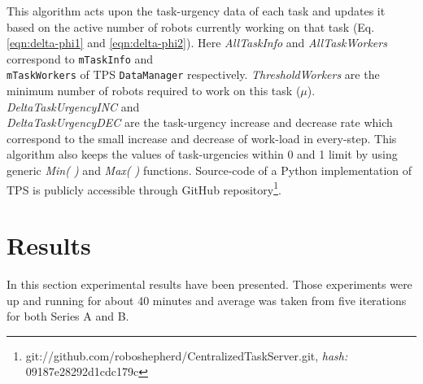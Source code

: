 This algorithm acts upon the task-urgency data of each task and updates it based on the active number of robots currently working on that task (Eq. \ref{eqn:delta-phi1} and \ref{eqn:delta-phi2}). Here \textit{AllTaskInfo} and \textit{AllTaskWorkers}  correspond to  \texttt{mTaskInfo} and\\ \texttt{mTaskWorkers} of TPS \texttt{DataManager} respectively.  \textit{ThresholdWorkers} are the minimum number of robots required to work on this task ($\mu$). \textit{DeltaTaskUrgencyINC} and\\ \textit{DeltaTaskUrgencyDEC} are the task-urgency increase and decrease rate which correspond to the small increase and decrease of work-load in every-step. This algorithm also keeps the values of task-urgencies within 0 and 1 limit by using generic \textit{Min( )} and \textit{Max( )} functions. Source-code of a Python implementation of TPS is publicly accessible through GitHub repository\footnote{git://github.com/roboshepherd/CentralizedTaskServer.git,  \textit{hash:} 09187e28292d1cdc179c}.
\section{Results}
\label{afm:results}
In this section experimental results  have been presented. Those experiments were up and running for about 40 minutes and average was taken from five iterations for both Series A and B.
